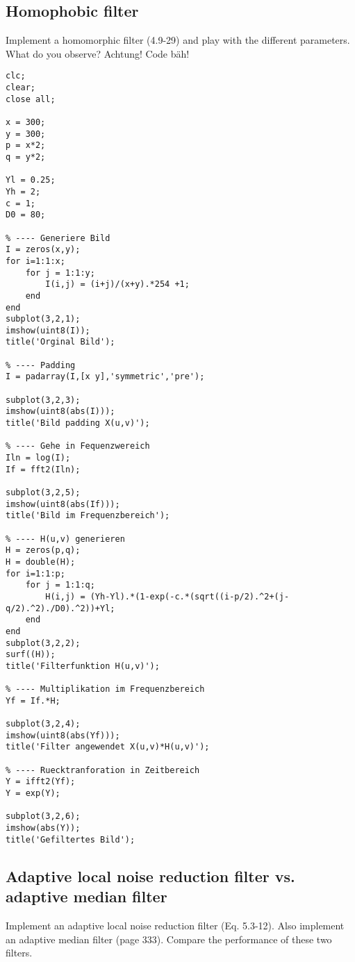 \subsection{Homophobic filter}
Implement a homomorphic filter (4.9-29) and play with the different parameters.
What do you observe?
Achtung! Code bäh!
\begin{lstlisting}
clc;
clear;
close all;

x = 300;
y = 300;
p = x*2;
q = y*2;

Yl = 0.25;
Yh = 2;
c = 1;
D0 = 80;

% ---- Generiere Bild
I = zeros(x,y);
for i=1:1:x;
    for j = 1:1:y;
        I(i,j) = (i+j)/(x+y).*254 +1;
    end
end
subplot(3,2,1);
imshow(uint8(I));
title('Orginal Bild');

% ---- Padding
I = padarray(I,[x y],'symmetric','pre');

subplot(3,2,3);
imshow(uint8(abs(I)));
title('Bild padding X(u,v)');

% ---- Gehe in Fequenzwereich
Iln = log(I);
If = fft2(Iln);

subplot(3,2,5);
imshow(uint8(abs(If)));
title('Bild im Frequenzbereich');

% ---- H(u,v) generieren
H = zeros(p,q);
H = double(H);
for i=1:1:p;
    for j = 1:1:q;
        H(i,j) = (Yh-Yl).*(1-exp(-c.*(sqrt((i-p/2).^2+(j-q/2).^2)./D0).^2))+Yl;
    end
end
subplot(3,2,2);
surf((H));
title('Filterfunktion H(u,v)');

% ---- Multiplikation im Frequenzbereich
Yf = If.*H;

subplot(3,2,4);
imshow(uint8(abs(Yf)));
title('Filter angewendet X(u,v)*H(u,v)');

% ---- Ruecktranforation in Zeitbereich
Y = ifft2(Yf);
Y = exp(Y);

subplot(3,2,6);
imshow(abs(Y));
title('Gefiltertes Bild');

\end{lstlisting}
\subsection{Adaptive local noise reduction filter vs. adaptive median filter}
Implement an adaptive local noise reduction filter (Eq. 5.3-12). Also implement
an adaptive median filter (page 333). Compare the performance of these two filters.
